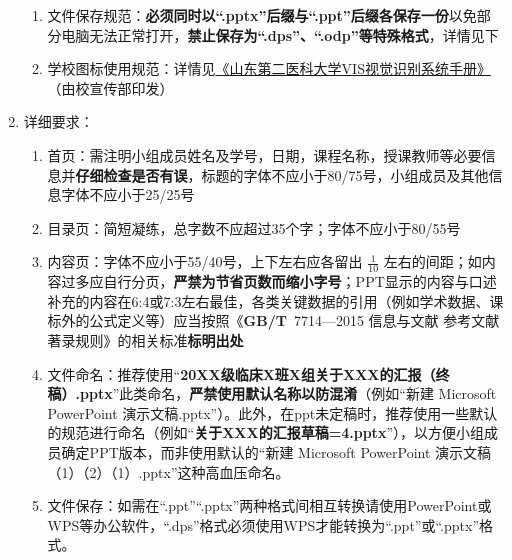 \begin{enumerate}
\begin{enumerate}
                  \item 文件保存规范\footnotemark：\textbf{必须同时以“.pptx”后缀与“.ppt”后缀各保存一份}以免部分电脑无法正常打开，\textbf{禁止保存为“.dps”、“.odp”等特殊格式}，详情见下
                  \item 学校图标使用规范：详情见\uline{\href{https://www.wfmc.edu.cn/4229/list.htm}{《山东第二医科大学VIS视觉识别系统手册》}}（由校宣传部印发）
            \end{enumerate}
      \item 详细要求：
            \begin{enumerate}
                  \item 首页：需注明小组成员姓名及学号，日期，课程名称，授课教师等必要信息并\textbf{仔细检查是否有误}，标题的字体不应小于80/75号，小组成员及其他信息字体不应小于25/25号
                  \item 目录页：简短凝练，总字数不应超过35个字；字体不应小于80/55号
                  \item 内容页：字体\footnotemark 不应小于55/40号，上下左右应各留出 $\frac{1}{10}$ 左右的间距；如内容过多应自行分页，\textbf{严禁为节省页数而缩小字号}；PPT显示的内容与口述补充的内容在6:4或7:3左右最佳，各类关键数据的引用（例如学术数据、课标外的公式定义等）应当按照\linebreak[3]《\textbf{GB/T}\ 7714—2015 信息与文献 参考文献著录规则》的相关标准\textbf{标明出处}
                  \item 文件命名\footnotemark：推荐使用“\textbf{20XX级临床X班X组关于XXX的汇报（终稿）.pptx}”此类命名，\textbf{严禁使用默认名称以防混淆}（例如“新建 Microsoft PowerPoint 演示文稿.pptx”）。此外，在ppt未定稿时，推荐使用一些默认的规范进行命名（例如“\textbf{关于XXX的汇报草稿=4.pptx}”），以方便小组成员确定PPT版本，而非使用默认的“新建 Microsoft PowerPoint 演示文稿（1）（2）（1）.pptx”这种高血压命名。
                  \item 文件保存\footnotemark：如需在“.ppt”“.pptx”两种格式间相互转换请使用PowerPoint或WPS等办公软件，“.dps”格式必须使用WPS才能转换为“.ppt”或“.pptx”格式。
            \end{enumerate}

\end{enumerate}

